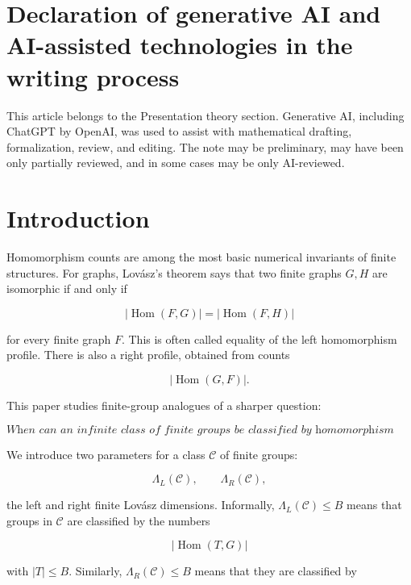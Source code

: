 \documentclass[11pt]{article}
\begin{document}
\begin{abstract}
\[
\operatorname{End}(Q)=\operatorname{Aut}(Q)\cup\{0\},
\]

and $V^Q=0$, then the coprime affine groups $V\rtimes Q$ satisfy both two-object test properties. The proof reduces hom-counts to a positive-definite exponential kernel on semisimple multiplicity vectors.
\end{abstract}

\section*{Declaration of generative AI and AI-assisted technologies in the writing process}
This article belongs to the Presentation theory section. Generative AI, including ChatGPT by \mbox{OpenAI}, was used to assist with mathematical drafting, formalization, review, and editing. The note may be preliminary, may have been only partially reviewed, and in some cases may be only AI-reviewed.

\section{Introduction}

Homomorphism counts are among the most basic numerical invariants of finite structures. For graphs, Lovász's theorem says that two finite graphs $G,H$ are isomorphic if and only if

\[
|\operatorname{Hom}(F,G)|=|\operatorname{Hom}(F,H)|
\]

for every finite graph $F$. This is often called equality of the left homomorphism profile. There is also a right profile, obtained from counts

\[
|\operatorname{Hom}(G,F)|.
\]

This paper studies finite-group analogues of a sharper question:

\[
\textit{When can an infinite class of finite groups be classified by homomorphism counts involving only bounded-size test groups?}
\]

We introduce two parameters for a class $\mathcal C$ of finite groups:

\[
\Lambda_L(\mathcal C),
\qquad
\Lambda_R(\mathcal C),
\]

the left and right finite Lovász dimensions. Informally, $\Lambda_L(\mathcal C)\le B$ means that groups in $\mathcal C$ are classified by the numbers

\[
|\operatorname{Hom}(T,G)|
\]

with $|T|\le B$. Similarly, $\Lambda_R(\mathcal C)\le B$ means that they are classified by
\end{document}
